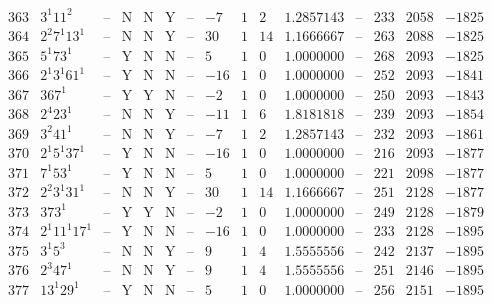 \documentclass[11pt,reqno,a4letter]{article}
\numberwithin{figure}{section}
\numberwithin{table}{section}
\theoremstyle{plain}
\numberwithin{theorem}{section}
\theoremstyle{definition}
\begin{document}
\begin{table}[h!]
\begin{equation*}
{\begin{array}{|cc|c|ccc|c|c|ccc|c|ccc}
 363 & 3^1 11^2 & \text{--} & \text{N} & \text{N} & \text{Y} & \text{--} & -7 & 1 & 2 & 1.2857143 & \text{--} & 233 & 2058 & -1825 \\
 364 & 2^2 7^1 13^1 & \text{--} & \text{N} & \text{N} & \text{Y} & \text{--} & 30 & 1 & 14 & 1.1666667 & \text{--} & 263 & 2088 & -1825 \\
 365 & 5^1 73^1 & \text{--} & \text{Y} & \text{N} & \text{N} & \text{--} & 5 & 1 & 0 & 1.0000000 & \text{--} & 268 & 2093 & -1825 \\
 366 & 2^1 3^1 61^1 & \text{--} & \text{Y} & \text{N} & \text{N} & \text{--} & -16 & 1 & 0 & 1.0000000 & \text{--} & 252 & 2093 & -1841 \\
 367 & 367^1 & \text{--} & \text{Y} & \text{Y} & \text{N} & \text{--} & -2 & 1 & 0 & 1.0000000 & \text{--} & 250 & 2093 & -1843 \\
 368 & 2^4 23^1 & \text{--} & \text{N} & \text{N} & \text{Y} & \text{--} & -11 & 1 & 6 & 1.8181818 & \text{--} & 239 & 2093 & -1854 \\
 369 & 3^2 41^1 & \text{--} & \text{N} & \text{N} & \text{Y} & \text{--} & -7 & 1 & 2 & 1.2857143 & \text{--} & 232 & 2093 & -1861 \\
 370 & 2^1 5^1 37^1 & \text{--} & \text{Y} & \text{N} & \text{N} & \text{--} & -16 & 1 & 0 & 1.0000000 & \text{--} & 216 & 2093 & -1877 \\
 371 & 7^1 53^1 & \text{--} & \text{Y} & \text{N} & \text{N} & \text{--} & 5 & 1 & 0 & 1.0000000 & \text{--} & 221 & 2098 & -1877 \\
 372 & 2^2 3^1 31^1 & \text{--} & \text{N} & \text{N} & \text{Y} & \text{--} & 30 & 1 & 14 & 1.1666667 & \text{--} & 251 & 2128 & -1877 \\
 373 & 373^1 & \text{--} & \text{Y} & \text{Y} & \text{N} & \text{--} & -2 & 1 & 0 & 1.0000000 & \text{--} & 249 & 2128 & -1879 \\
 374 & 2^1 11^1 17^1 & \text{--} & \text{Y} & \text{N} & \text{N} & \text{--} & -16 & 1 & 0 & 1.0000000 & \text{--} & 233 & 2128 & -1895 \\
 375 & 3^1 5^3 & \text{--} & \text{N} & \text{N} & \text{Y} & \text{--} & 9 & 1 & 4 & 1.5555556 & \text{--} & 242 & 2137 & -1895 \\
 376 & 2^3 47^1 & \text{--} & \text{N} & \text{N} & \text{Y} & \text{--} & 9 & 1 & 4 & 1.5555556 & \text{--} & 251 & 2146 & -1895 \\
 377 & 13^1 29^1 & \text{--} & \text{Y} & \text{N} & \text{N} & \text{--} & 5 & 1 & 0 & 1.0000000 & \text{--} & 256 & 2151 & -1895 \\

\end{array}}
\end{equation*}
\end{table}
\end{document}
